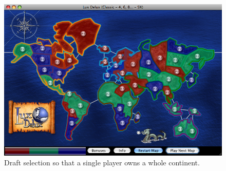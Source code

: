 \documentclass[letterpaper]{article}
\numberwithin{equation}{section}
\numberwithin{theorem}{section}
\numberwithin{lemma}{section}
\numberwithin{df}{section}
\begin{document}
\begin{figure}[htp]
\centering
\includegraphics[scale=0.3]{testmapcontinent.png}
\caption{Draft selection so that a single player owns a whole continent.}\label{fig:continent}
\end{figure}
\end{document}
